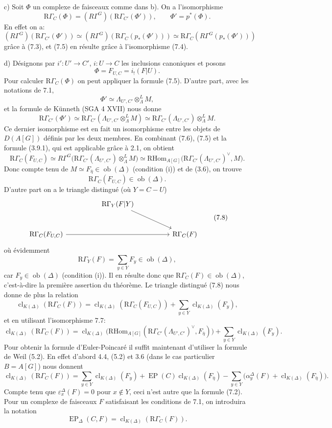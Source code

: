 \documentclass[11pt]{article}
\providecommand{\RHom}{\mathrm{RHom}}
\providecommand{\EP}{\operatorname{EP}}
\providecommand{\Ob}{\operatorname{ob}}
\providecommand{\RHom}{\mathrm{RHom}}
\providecommand{\RHom}{\mathrm R\mathcal{H}om}
\providecommand{\Ob}{\operatorname{ob}}
\providecommand{\EP}{\operatorname{EP}}
\providecommand{\Ob}{\operatorname{Ob}}
\providecommand{\clK}[1]{\operatorname{cl}_{K(#1)}}
\providecommand{\RG}{\mathrm R\Gamma}
\providecommand{\RHom}{\mathrm{RHom}}
\providecommand{\Ob}{\operatorname{ob}}
\begin{document}
c) Soit $\Phi$ un complexe de faisceaux comme dans b). On a l'isomorphisme
\[
\RG_C(\Phi)=(R\Gamma^G)(\RG_{C'}(\Phi')),
\qquad \Phi'=p^*(\Phi).
\tag{7.5}
\]
En effet on a:
\[
(R\Gamma^G)(\RG_{C'}(\Phi'))
\simeq
(R\Gamma^G)(\RG_C(p_*(\Phi')))
\simeq
\RG_C(R\Gamma^G(p_*(\Phi')))
\]
grâce à (7.3), et (7.5) en résulte grâce à l'isomorphisme (7.4).

d) Désignons par $i':U'\to C'$, $i:U\to C$ les inclusions canoniques et posons
\[
\Phi=F_{U,C}=i_!(F|U).
\]
Pour calculer $\RG_C(\Phi)$ on peut appliquer la formule (7.5). D'autre part, avec les notations de 7.1,
\[
\Phi'\simeq \Lambda_{U',C'}\otimes_\Lambda^L M,
\]
et la formule de Künneth (SGA 4 XVII) nous donne
\[
\RG_{C'}(\Phi')
\simeq
\RG_{C'}(\Lambda_{U',C'}\otimes_\Lambda^L M)
\simeq
\RG_{C'}(\Lambda_{U',C'})\otimes_\Lambda^L M.
\tag{7.6}
\]
Ce dernier isomorphisme est en fait un isomorphisme entre les objets de $D(A[G])$ définis par les deux membres. En combinant (7.6), (7.5) et la formule (3.9.1), qui est applicable grâce à 2.1, on obtient
\[
\RG_C(F_{U,C})
\simeq
R\Gamma^G\bigl(\RG_{C'}(\Lambda_{U',C'})\otimes_\Lambda^L M\bigr)
\simeq
\RHom_{A[G]}\bigl(\RG_{C'}(\Lambda_{U',C'})^\vee,M\bigr).
\tag{7.7}
\]
Donc compte tenu de $M\simeq F_{\bar\eta}\in\Ob(\Delta)$ (condition (i)) et de (3.6), on trouve
\[
\RG_C(F_{U,C})\in\Ob(\Delta).
\]
D'autre part on a le triangle distingué (où $Y=C-U$)
\[
\begin{tikzcd}[column sep=huge,row sep=large]
& \RG_Y(F|Y) \arrow[dr] & \\
\RG_C(F_{U,C}) \arrow[rr] && \RG_C(F)
\end{tikzcd}
\tag{7.8}
\]
où évidemment
\[
\RG_Y(F)=\sum_{y\in Y}F_y\in\Ob(\Delta),
\]
car $F_y\in\Ob(\Delta)$ (condition (i)). Il en résulte donc que $\RG_C(F)\in\Ob(\Delta)$, c'est-à-dire la première assertion du théorème. Le triangle distingué (7.8) nous donne de plus la relation
\[
\clK{\Delta}(\RG_C(F))
=
\clK{\Delta}(\RG_C(F_{U,C}))
+\sum_{y\in Y}\clK{\Delta}(F_y),
\]
et en utilisant l'isomorphisme 7.7:
\[
\clK{\Delta}(\RG_C(F))
=
\clK{\Delta}\bigl(\RHom_{A[G]}(\RG_{C'}(\Lambda_{U',C'})^\vee,F_{\bar\eta})\bigr)
+\sum_{y\in Y}\clK{\Delta}(F_y).
\]
Pour obtenir la formule d'Euler-Poincaré il suffit maintenant d'utiliser la formule de Weil (5.2). En effet d'abord 4.4, (5.2) et 3.6 (dans le cas particulier $B=A[G]$) nous donnent
\[
\clK{\Delta}(\RG_C(F))
=
\sum_{y\in Y}\clK{\Delta}(F_y)
+\EP(C)\clK{\Delta}(F_{\bar\eta})
-\sum_{y\in Y}\bigl(\alpha_y^\Delta(F)+\clK{\Delta}(F_{\bar\eta})\bigr).
\]
Compte tenu que $\varepsilon_x^\Delta(F)=0$ pour $x\notin Y$, ceci n'est autre que la formule (7.2). Pour un complexe de faisceaux $F$ satisfaisant les conditions de 7.1, on introduira la notation
\[
\EP_\Delta(C,F)=\clK{\Delta}(\RG_C(F)).
\]
\end{document}
